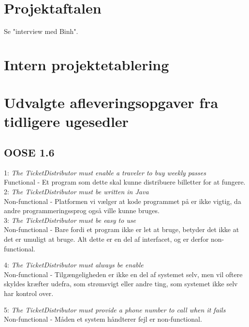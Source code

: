 \documentclass{article}
\begin{document}
\section{Projektaftalen}
Se "interview med Binh".

\section{Intern projektetablering}


\section{Udvalgte afleveringsopgaver fra tidligere ugesedler}

\subsection{OOSE 1.6}
1: \textit{The TicketDistributor must enable a traveler to buy weekly passes} \\
Functional - Et program som dette skal kunne distribuere billetter for at fungere. \\

2: \textit{The TicketDistributor must be written in Java} \\
Non-functional - Platformen vi vælger at kode programmet på er ikke vigtig, da andre programmeringssprog også ville kunne bruges. \\

3: \textit{The TicketDistributor must be easy to use} \\
Non-functional - Bare fordi et program ikke er let at bruge, betyder det ikke at det er umuligt at bruge. Alt dette er en del af interfacet, og er derfor non-functional.

4: \textit{The TicketDistributor must always be enable} \\
Non-functional - Tilgængeligheden er ikke en del af systemet selv, men vil oftere skyldes kræfter udefra, som strømsvigt eller andre ting, som systemet ikke selv har kontrol over.

5: \textit{The TicketDistributor must provide a phone number to call when it fails} \\
Non-functional - Måden et system håndterer fejl er non-functional.
\end{document}
